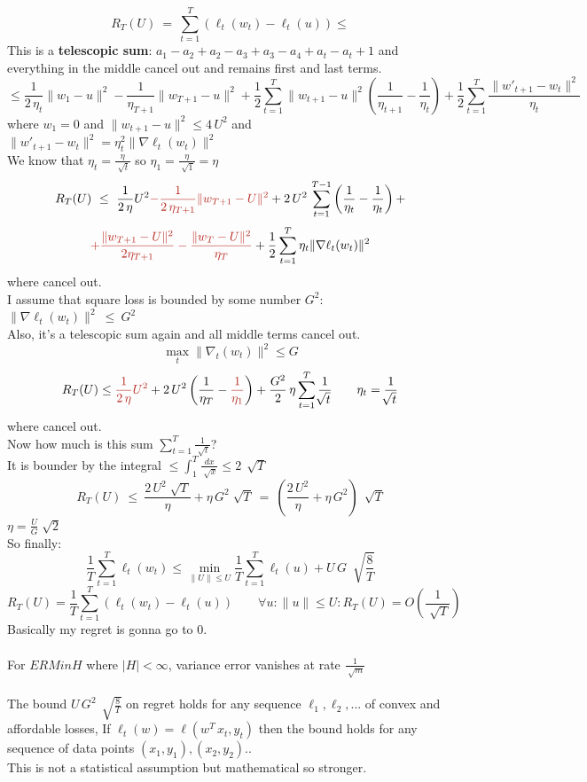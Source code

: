 \documentclass[../main.tex]{subfiles}
\begin{document}
$$
R_T(U) \ = \ \sum_{t=1}^{T} \left( \ell_t(w_t) - \ell_t(u) \right) \leq
$$
This is a \textbf{telescopic sum}:  $a_1-a_2+a_2-a_3+a_3-a_4+a_t -a_t+1$ and everything in the middle cancel out and remains first and last terms.
\\
$$
\leq  \frac{1}{2 \, \eta_t} \|w_1-u\|^2 - \frac{1}{\eta_{T+1}} \| w_{T+1} -u \| ^2 + \frac{1}{2} \sum_{t=1}^T \| w_{t+1} - u \|^2 \left( \frac{1}{\eta_{t+1}} - \frac{1}{\eta_t}\right) + \frac{1}{2} \sum_{t=1}^T \frac{\| w'_{t+1} -w_t \|^2}{\eta_t}
$$
where $w_1 = 0 $ \quad and  \quad $\| w_{t+1} - u \|^2 \leq 4 \, U^2$ \quad and \quad 
$
\| w'_{t+1} -w_t \|^2 = \eta_t^2 \| \nabla \ell_t (w_t) \|^2
$\\
We know that $\eta_t = \frac{\eta}{\sqrt[]{t}}$ \qquad so $\eta_1 = \frac{\eta}{\sqrt[]{1}} = \eta$
$$
R_T(U) \ \leq \ \frac{1}{2 \, \eta} U^2 
\red{
- \frac{1}{2 \, \eta_{T+1}} \|w_{T+1} - U \|^2 
}
+2 \, U^2 \, \sum_{t=1}^{T-1} \left(\frac{1}{\eta_t} - \frac{1}{\eta_t}\right)+
$$
$$ 
\red{
+ \frac{\| w_{T+1} -U \|^2}{2 \eta_{T+1}} - \frac{\| w_{T} -U \|^2}{\eta_T}  }
+ \frac{1}{2} \sum_{t=1}^T \eta_t \| \nabla \ell_t(w_t) \|^2 
$$
where  cancel out.
\\
I assume that square loss is bounded by some number $G^2$: $ \| \nabla \ell_t(w_t) \|^2 \ \leq \ G^2 $
\\
Also, it's a telescopic sum again and all middle terms cancel out.
\\
$$
\max_t \| \nabla_t(w_t) \|^2 \leq G
$$
$$
R_T(U) \leq \red{\frac{1}{2 \, \eta} U^2} + 2\, U^2 \left( \frac{1}{\eta_{T}} - \red{ \frac{1}{\eta_1} }\right) + \frac{G^2}{2} \, \eta \sum_{t=1}^T \frac{1}{\sqrt[]{t}} \qquad \eta_t = \frac{1}{\sqrt[]{t}}
$$
where  cancel out.
\\
Now how much is this sum $ \sum_{t=1}^T  \frac{1}{\sqrt[]{t}}$?
\\
It is bounder by the integral 
$
\leq \int_{1}^{T} \frac{dx}{\sqrt[]{x}} \leq 2 \, \sqrt[]{T}
$
$$
R_T(U) \ \leq \ \frac{2 \, U^2 \sqrt[]{T}}{\eta} + \eta \, G^2 \sqrt[]{T} \ = \ \left( \frac{2\, U^2}{\eta} + \eta \, G^2 \right) \, \sqrt[]{T} $$
$ \eta = \frac{U}{G} \sqrt[]{2}
$
\\
So finally:
$$
\frac{1}{T} \sum_{t=1}^T \ell_t(w_t) \leq \min_{\|U\| \leq U} \frac{1}{T} \sum_{t=1}^T \ell_t(u) + U \, G \ \sqrt[]{\frac{8}{T}}
$$
$$
R_T(U) = \frac{1}{T} \sum_{t=1}^T \left( \ell_t (w_t) - \ell_t(u) \right) \qquad \forall u : \|u\| \leq U : R_T(U) = O \left(\frac{1}{\sqrt[]{T}}\right)
$$
Basically my regret is gonna go to 0. 
\\\\
For $ERM in H$ where $| H| < \infty$, variance error vanishes at rate $\frac{1}{\sqrt[]{m}}$
\\\\
The bound $U \, G^2 \, \sqrt[]{\frac{8}{T}}$ on regret holds for any sequence $\ell_1, \ell_2, ...$ of convex and affordable losses, If $\ell_t(w) = \ell(w^T \, x_t, y_t)$ then the bound holds for any sequence of data points $(x_1,y_1), (x_2, y_2)..$
\\ 
This is not a statistical assumption but mathematical so stronger.
\end{document}
